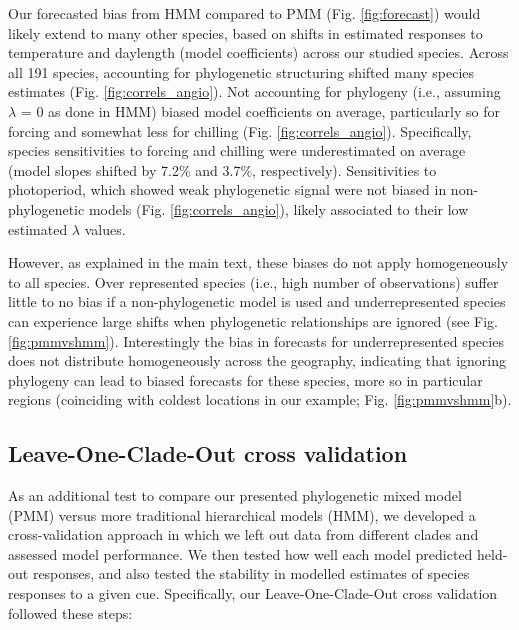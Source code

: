 \documentclass[11pt]{article}
\begin{document}
Our forecasted bias from HMM compared to PMM (Fig. \ref{fig:forecast}) would likely extend to many other species, based on shifts in estimated responses to temperature and daylength (model coefficients) across our studied species. Across all 191 species, accounting for phylogenetic structuring shifted many species estimates (Fig. \ref{fig:correls_angio}). Not accounting for phylogeny (i.e., assuming $\lambda$ = 0 as done in HMM) biased model coefficients on average, particularly so for forcing and somewhat less for chilling (Fig. \ref{fig:correls_angio}). Specifically, species sensitivities to forcing and chilling were underestimated on average (model slopes shifted by 7.2\% and 3.7\%, respectively). Sensitivities to photoperiod, which showed weak phylogenetic signal were not biased in non-phylogenetic models (Fig. \ref{fig:correls_angio}), likely associated to their low estimated $\lambda$ values. 

However, as explained in the main text, these biases do not apply homogeneously to all species. Over represented species (i.e., high number of observations) suffer little to no bias if a non-phylogenetic model is used and underrepresented species can experience large shifts when phylogenetic relationships are ignored (see Fig. \ref{fig:pmmvshmm}). Interestingly the bias in forecasts for underrepresented species does not distribute homogeneously across the geography, indicating that ignoring phylogeny can lead to biased forecasts for these species, more so in particular regions (coinciding with coldest locations in our example; Fig. \ref{fig:pmmvshmm}b).\\ 


\subsection{Leave-One-Clade-Out cross validation}

As an additional test to compare our presented phylogenetic mixed model (PMM) versus more traditional hierarchical models (HMM), we developed a cross-validation approach in which we left out data from different clades and assessed model performance. We then tested how well each model predicted held-out responses, and also tested the stability in modelled estimates of species responses to a given cue. Specifically, our Leave-One-Clade-Out cross validation followed these steps:
\end{document}
